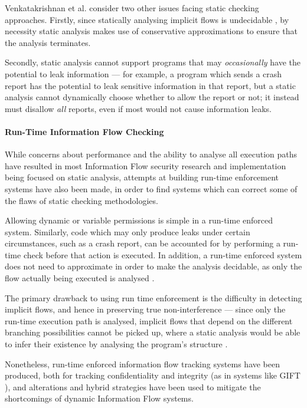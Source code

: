 	Venkatakrishnan et al. \cite{venkatakrishnan2006runtime} consider two other issues facing static checking approaches. Firstly, since statically analysing implicit flows is undecidable \cite{landi1992undecidability}, by necessity static analysis makes use of conservative approximations to ensure that the analysis terminates.
	
	Secondly, static analysis cannot support programs that may \textit{occasionally} have the potential to leak information \cite{venkatakrishnan2006runtime} --- for example, a program which sends a crash report has the potential to leak sensitive information in that report, but a static analysis cannot dynamically choose whether to allow the report or not; it instead must disallow \textit{all} reports, even if most would not cause information leaks.
	
	\paragraph{Run-Time Information Flow Checking}
	
	While concerns about performance and the ability to analyse all execution paths have resulted in most Information Flow security research and implementation being focused on static analysis, attempts at building run-time enforcement systems have also been made, in order to find systems which can correct some of the flaws of static checking methodologies.
	
	Allowing dynamic or variable permissions is simple in a run-time enforced system. Similarly, code which may only produce leaks under certain circumstances, such as a crash report, can be accounted for by performing a run-time check before that action is executed. In addition, a run-time enforced system does not need to approximate in order to make the analysis decidable, as only the flow actually being executed is analysed \cite{venkatakrishnan2006runtime}.
	
	The primary drawback to using run time enforcement is the difficulty in detecting implicit flows, and hence in preserving true non-interference \cite{sabelfeld2003if} --- since only the run-time execution path is analysed, implicit flows that depend on the different branching possibilities cannot be picked up, where a static analysis would be able to infer their existence by analysing the program's structure \cite{venkatakrishnan2006runtime}.
	
	Nonetheless, run-time enforced information flow tracking systems have been produced, both for tracking confidentiality and integrity (as in systems like GIFT \cite{lam2006dynamicintegrity}), and alterations and hybrid strategies have been used to mitigate the shortcomings of dynamic Information Flow systems.
	
